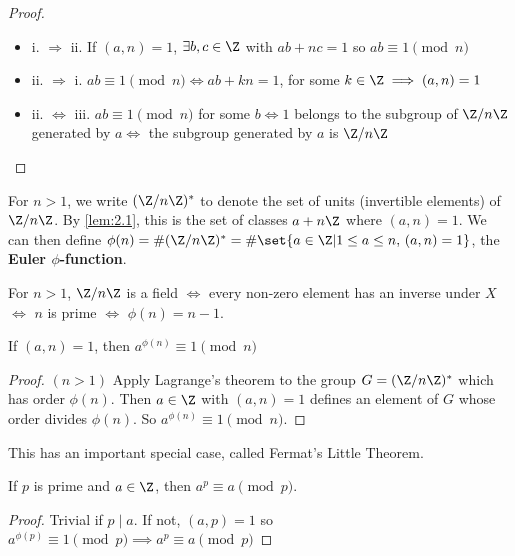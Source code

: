 \documentclass{article}
\begin{document}
\begin{proof}
    \leavevmode
    \begin{itemize}[label={}]
        \item i. $\Rightarrow$ ii. If $(a, n) = 1$, $\exists b, c \in \Z$ with $ab+nc=1$ so $ab \equiv 1 \pmod{n}$
        \item ii. $\Rightarrow$ i. $ab \equiv 1 \pmod{n} \iff ab+kn=1$, for some $k \in \Z \implies (a, n)= 1$
        \item ii. $\Leftrightarrow$ iii. $ab \equiv 1 \pmod{n}$ for some $b \iff 1$ belongs to the subgroup of $\Z / n \Z$ generated by $a \iff$ the subgroup generated by $a$ is $\Z / n \Z$
    \end{itemize}
\end{proof}

\begin{notation}
    For $n > 1$, we write $(\Z / n \Z)^*$ to denote the set of units (invertible elements) of $\Z / n \Z$. By \cref{lem:2.1}, this is the set of classes $a + n \Z$ where $(a, n) = 1$.
    We can then define $\phi(n) =\# (\Z / n \Z)^* = \# \set{a \in \Z | 1 \leq a \leq n, \, (a, n) = 1}$, the \textbf{Euler $\phi$-function}.
\end{notation}

\begin{remark}
    For $n>1$, $\Z/n\Z$ is a field $\iff$ every non-zero element has an inverse under $X$ $\iff$ $n$ is prime $\iff$ $\phi(n) = n-1$.
\end{remark}

\begin{thm}
    If $(a, n) = 1$, then $a^{\phi(n)} \equiv 1 \pmod{n}$
\end{thm}

\begin{proof}
    $(n>1)$ Apply Lagrange's theorem to the group $G = (\Z/n\Z)^*$ which has order $\phi(n)$. Then $a \in \Z$ with $(a, n) = 1$ defines an element of $G$ whose order divides $\phi(n)$. So $a^{\phi(n)} \equiv 1 \pmod{n}$.
\end{proof}

This has an important special case, called Fermat's Little Theorem.
\begin{thm}
    If $p$ is prime and $a \in \Z$, then $a^p \equiv a \pmod{p}$.
\end{thm}

\begin{proof}
    Trivial if $p \mid a$.  If not, $(a, p) = 1$ so $a^{\phi(p)} \equiv 1 \pmod{p} \implies a^p \equiv a \pmod{p}$
\end{proof}
\end{document}
